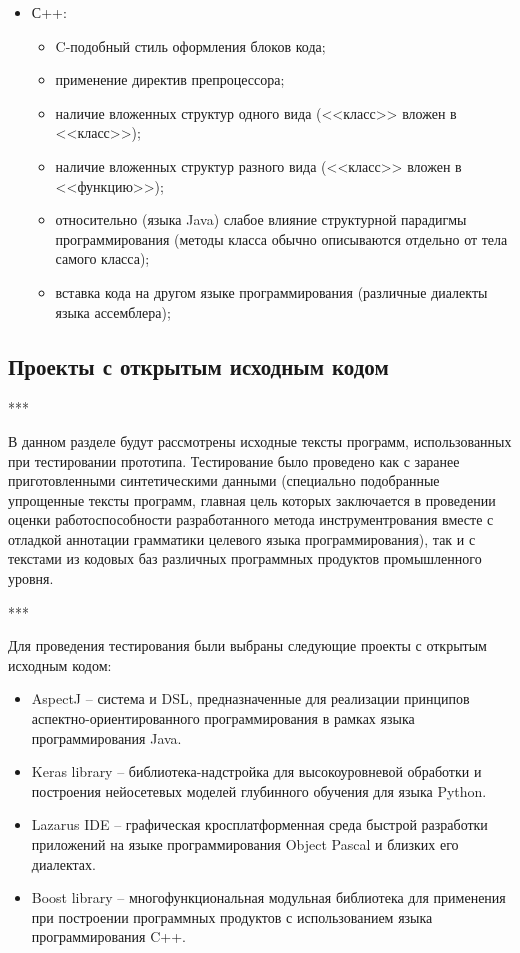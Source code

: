 \begin{itemize}[noitemsep]
  \item С++:
    \begin{itemize}[noitemsep]
      \item C-подобный стиль оформления блоков кода;
      \item применение директив препроцессора;
      \item наличие вложенных структур одного вида (<<класс>> вложен в <<класс>>);
      \item наличие вложенных структур разного вида (<<класс>> вложен в <<функцию>>);
      \item относительно (языка Java) слабое влияние структурной парадигмы программирования (методы класса обычно описываются отдельно от тела самого класса);
      \item вставка кода на другом языке программирования (различные диалекты языка ассемблера);
    \end{itemize}
\end{itemize}

\subsection{Проекты с открытым исходным кодом}

***

В данном разделе будут рассмотрены исходные тексты программ, использованных при тестировании прототипа.
Тестирование было проведено как с заранее приготовленными синтетическими данными (специально подобранные упрощенные тексты программ, главная цель которых заключается в проведении оценки работоспособности разработанного метода инструментрования вместе с отладкой аннотации грамматики целевого языка программирования), так и с текстами из кодовых баз различных программных продуктов промышленного уровня.

***

Для проведения тестирования были выбраны следующие проекты с открытым исходным кодом:

\begin{itemize}[noitemsep]
  \item AspectJ       \cite{aspectj} --
  система и DSL, предназначенные для реализации принципов аспектно-ориентированного программирования в рамках языка программирования Java.

  \item Keras library \cite{keras} --
  библиотека-надстройка для высокоуровневой обработки и построения нейосетевых моделей глубинного обучения для языка Python.

  \item Lazarus IDE   \cite{lazarus} --
  графическая кросплатформенная среда быстрой разработки приложений на языке программирования Object Pascal и близких его диалектах.

  \item Boost library \cite{boost} --
  многофункциональная модульная библиотека для применения при построении программных продуктов с использованием языка программирования C++.
\end{itemize}

